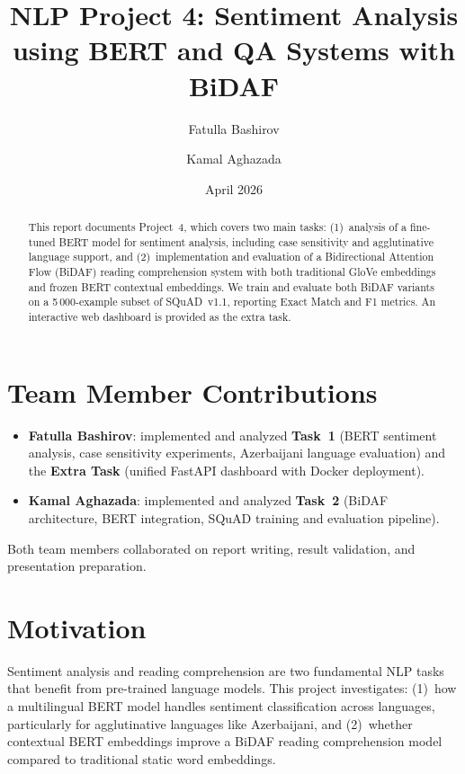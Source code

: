 \documentclass[10pt,a4paper]{article}
\title{NLP Project 4: Sentiment Analysis using BERT and QA Systems with BiDAF}
\author{Fatulla Bashirov \and Kamal Aghazada}
\date{April 2026}
\begin{document}
\maketitle

\begin{abstract}
This report documents Project~4, which covers two main tasks: (1)~analysis of a fine-tuned BERT model for sentiment analysis, including case sensitivity and agglutinative language support, and (2)~implementation and evaluation of a Bidirectional Attention Flow (BiDAF) reading comprehension system with both traditional GloVe embeddings and frozen BERT contextual embeddings. We train and evaluate both BiDAF variants on a 5\,000-example subset of SQuAD~v1.1, reporting Exact Match and F1 metrics. An interactive web dashboard is provided as the extra task.
\end{abstract}

\section{Team Member Contributions}

\begin{itemize}
    \item \textbf{Fatulla Bashirov}: implemented and analyzed \textbf{Task~1} (BERT sentiment analysis, case sensitivity experiments, Azerbaijani language evaluation) and the \textbf{Extra Task} (unified FastAPI dashboard with Docker deployment).
    \item \textbf{Kamal Aghazada}: implemented and analyzed \textbf{Task~2} (BiDAF architecture, BERT integration, SQuAD training and evaluation pipeline).
\end{itemize}

Both team members collaborated on report writing, result validation, and presentation preparation.

\section{Motivation}

Sentiment analysis and reading comprehension are two fundamental NLP tasks that benefit from pre-trained language models. This project investigates: (1)~how a multilingual BERT model handles sentiment classification across languages, particularly for agglutinative languages like Azerbaijani, and (2)~whether contextual BERT embeddings improve a BiDAF reading comprehension model compared to traditional static word embeddings.
\end{document}

